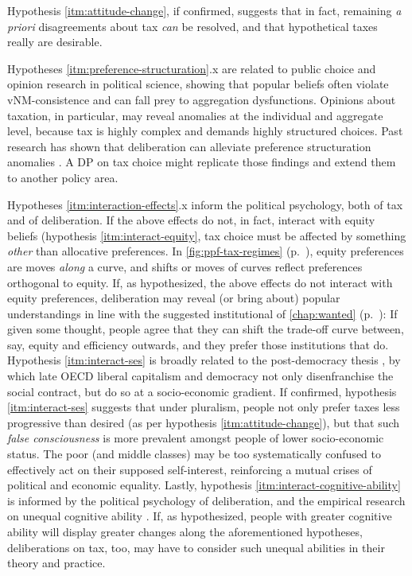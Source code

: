 Hypothesis \ref{itm:attitude-change}, if confirmed, suggests that in fact, remaining \emph{a priori} disagreements about tax \emph{can} be resolved, and that hypothetical taxes really are desirable.

Hypotheses \ref{itm:preference-structuration}.x are related to public choice and opinion research in political science, showing that popular beliefs often violate \gls{vNM}-consistence and can fall prey to aggregation dysfunctions.
Opinions about taxation, in particular, may reveal anomalies at the individual and aggregate level, because tax is highly complex and demands highly structured choices.
Past research has shown that deliberation can alleviate preference structuration anomalies  \citep{Farrar2003}.
A \gls{DP} on tax choice might replicate those findings and extend them to another policy area.

Hypotheses \ref{itm:interaction-effects}.x inform the political psychology, both of tax and of deliberation.
If the above effects do not, in fact, interact with equity beliefs (hypothesis \ref{itm:interact-equity}, tax choice must be affected by something \emph{other} than allocative preferences.
In \autoref{fig:ppf-tax-regimes} (p.~\pageref{fig:ppf-tax-regimes}), equity preferences are moves \emph{along} a curve, and shifts or moves of curves reflect preferences orthogonal to equity. 
If, as hypothesized, the above effects do not interact with equity preferences, deliberation may reveal (or bring about) popular understandings in line with the suggested institutional  of \autoref{chap:wanted} (p.~\pageref{chap:wanted}):
If given some thought, people agree that they can shift the trade-off curve between, say, equity and efficiency outwards, and they prefer those institutions that do.
Hypothesis \ref{itm:interact-ses} is broadly related to the post-democracy thesis \citep{Crouch2004}, by which late \gls{OECD} liberal capitalism and democracy not only disenfranchise the social contract, but do so at a socio-economic gradient.
If confirmed, hypothesis \ref{itm:interact-ses} suggests that under pluralism, people not only prefer taxes less progressive than desired (as per hypothesis \ref{itm:attitude-change}), but that such \emph{false consciousness} is more prevalent amongst people of lower socio-economic status.
The poor (and middle classes) may be too systematically confused to effectively act on their supposed self-interest, reinforcing a mutual crises of political and economic equality.
Lastly, hypothesis \ref{itm:interact-cognitive-ability} is informed by the political psychology of deliberation, and the empirical research on unequal cognitive ability \citep{Rosenberg-2002-aa}.
If, as hypothesized, people with greater cognitive ability will display greater changes along the aforementioned hypotheses, deliberations on tax, too, may have to consider such unequal abilities in their theory and practice.
	
